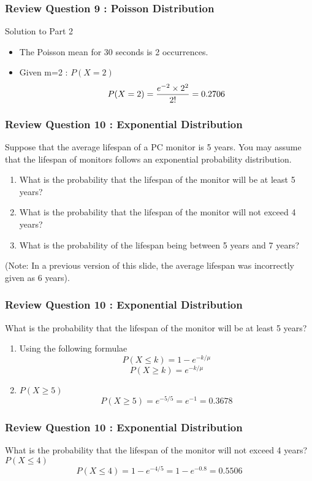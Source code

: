 \documentclass[a4]{beamer}
\begin{document}
\begin{frame}
\frametitle{Review Question 9 :  Poisson Distribution}
Solution to Part 2
\begin{itemize}
\item The Poisson mean for 30 seconds is 2 occurrences.
\item Given m=2 : $P(X = 2)$
\[P(X = 2) = { e^{-2} \times 2^2\over 2!} = 0.2706 \]
\end{itemize}
\end{frame}

\begin{frame}
\frametitle{Review Question 10 :  Exponential Distribution}
Suppose that the average lifespan of a PC monitor is 5 years. You may assume that the lifespan of monitors follows an exponential probability distribution.
    \begin{enumerate}
    \item What is the probability that the lifespan of the monitor will be at least 5 years?
    \item What is the probability that the lifespan of the monitor will not exceed 4 years?
    \item What is the probability of the lifespan being between 5 years and 7 years?
    \end{enumerate}
(Note: In a previous version of this slide, the average lifespan was incorrectly given as 6 years).
\end{frame}
\begin{frame}
\frametitle{Review Question 10 :  Exponential Distribution}
What is the probability that the lifespan of the monitor will be at least 5 years?
    \begin{enumerate}
    \item Using the following formulae
    \[P(X \leq k) = 1-e^{-k/\mu}\]
    \[P(X \geq k) = e^{-k/\mu}\]
    \item $P(X\geq 5)$
    \[P(X \geq 5) = e^{-5/5} = e^{-1} = 0.3678 \]
    \end{enumerate}
\end{frame}

\begin{frame}
\frametitle{Review Question 10 :  Exponential Distribution}
What is the probability that the lifespan of the monitor will not exceed 4 years?
$P(X\leq 4)$
    \[P(X \leq 4) = 1- e^{-4/5} = 1 - e^{-0.8} = 0.5506 \]

\end{frame}
\end{document}
